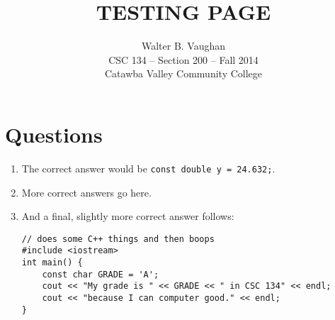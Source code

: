 \documentclass[11pt]{article}
\author{Walter B. Vaughan\\
        \small CSC 134 -- Section 200 -- Fall 2014\\
        \small Catawba Valley Community College}
\title{TESTING PAGE}
\date{\vspace{-5ex}}
\begin{document}
\maketitle

\section*{Questions}

\begin{enumerate}
	\item The correct answer would be \lstinline{const double y = 24.632;}.
	\item More correct answers go here.
	\item And a final, slightly more correct answer follows:
	\begin{lstlisting}
// does some C++ things and then boops
#include <iostream>
int main() {
	const char GRADE = 'A';
	cout << "My grade is " << GRADE << " in CSC 134" << endl;
	cout << "because I can computer good." << endl;
}
	\end{lstlisting}
\end{enumerate}
\end{document}
